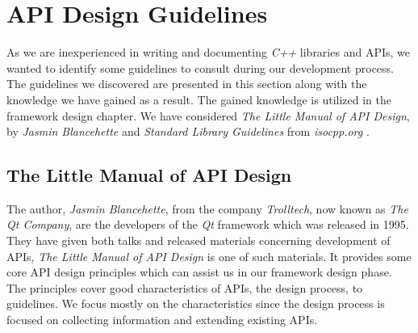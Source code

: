 \section{API Design Guidelines}
As we are inexperienced in writing and documenting \textit{C++} libraries and APIs, we wanted to identify some guidelines to consult during our development process. The guidelines we discovered are presented in this section along with the knowledge we have gained as a result. The gained knowledge is utilized in the framework design chapter. 
We have considered \textit{The Little Manual of API Design}, by \textit{Jasmin Blancehette} \cite{apiDesignManual} and \textit{Standard Library Guidelines} from \textit{isocpp.org} \cite{isoLibDesign}.

\subsection{The Little Manual of API Design}
The author, \textit{Jasmin Blancehette}, from the company \textit{Trolltech}, now known as \textit{The Qt Company}, are the developers of the \textit{Qt} framework which was released in 1995. They have given both talks and released materials concerning development of APIs, \textit{The Little Manual of API Design} is one of such materials. It provides some core API design principles which can assist us in our framework design phase. The principles cover good characteristics of APIs, the design process, to guidelines. We focus mostly on the characteristics since the design process is focused on collecting information and extending existing APIs.

